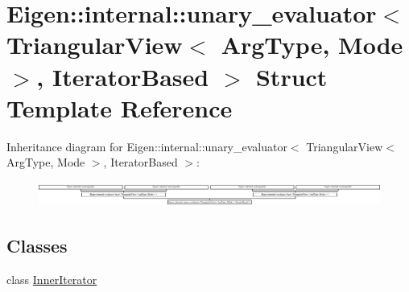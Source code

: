 \hypertarget{struct_eigen_1_1internal_1_1unary__evaluator_3_01_triangular_view_3_01_arg_type_00_01_mode_01_4_00_01_iterator_based_01_4}{}\section{Eigen\+:\+:internal\+:\+:unary\+\_\+evaluator$<$ Triangular\+View$<$ Arg\+Type, Mode $>$, Iterator\+Based $>$ Struct Template Reference}
\label{struct_eigen_1_1internal_1_1unary__evaluator_3_01_triangular_view_3_01_arg_type_00_01_mode_01_4_00_01_iterator_based_01_4}
Inheritance diagram for Eigen\+:\+:internal\+:\+:unary\+\_\+evaluator$<$ Triangular\+View$<$ Arg\+Type, Mode $>$, Iterator\+Based $>$\+:\begin{figure}[H]
\begin{center}
\leavevmode
\includegraphics[height=0.828402cm]{struct_eigen_1_1internal_1_1unary__evaluator_3_01_triangular_view_3_01_arg_type_00_01_mode_01_4_00_01_iterator_based_01_4}
\end{center}
\end{figure}
\subsection*{Classes}
\begin{DoxyCompactItemize}
\item 
class \hyperlink{class_eigen_1_1internal_1_1unary__evaluator_3_01_triangular_view_3_01_arg_type_00_01_mode_01_4_0e8ca4efc3cb45e07bfa597fdc256f969}{Inner\+Iterator}
\end{DoxyCompactItemize}
